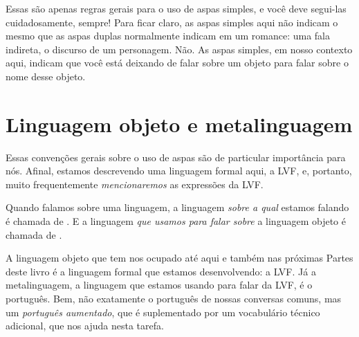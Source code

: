 Essas são apenas regras gerais para o uso de aspas simples, e você deve segui-las cuidadosamente, sempre!
Para ficar claro, as aspas simples aqui não indicam o mesmo que as aspas duplas normalmente indicam em um romance:
uma fala indireta, o discurso de um personagem.
Não.
As aspas simples, em nosso contexto aqui, indicam que você está deixando de falar sobre um objeto para falar sobre o nome desse objeto.


\section{Linguagem objeto e metalinguagem}\label{s:LingObjMeta}
Essas convenções gerais sobre o uso de aspas são de particular importância para nós.
Afinal, estamos descrevendo uma linguagem formal aqui, a LVF, e, portanto, muito frequentemente \emph{mencionaremos} as expressões da LVF.

Quando falamos sobre uma linguagem, a linguagem \emph{sobre a qual} estamos falando é chamada de .
E a linguagem \emph{que usamos para falar sobre} a linguagem objeto é chamada de .
\label{def.metalanguage}

A linguagem objeto que tem nos ocupado até aqui e também nas próximas Partes deste livro é a linguagem formal que estamos desenvolvendo: a LVF.
Já a metalinguagem, a linguagem que estamos usando para falar da LVF, é o português.
Bem, não exatamente o português de nossas conversas comuns, mas um \emph{português aumentado}, que é suplementado por um vocabulário técnico adicional, que nos ajuda nesta tarefa.

